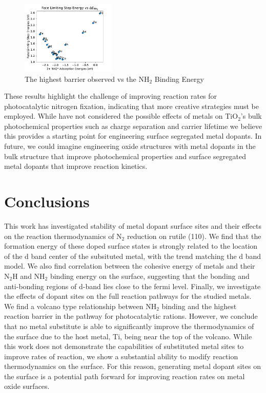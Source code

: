 \begin{figure}
    \centering
    \includegraphics[width=0.4\textwidth]{Images/NH2_v_rate_limiting.pdf}
    
    \caption{The highest barrier observed vs the NH$_2$ Binding Energy}
    \label{fig:NH2_limiting}
\end{figure}

These results highlight the challenge of improving reaction rates for photocatalytic nitrogen fixation, indicating that more creative strategies must be employed. While have not considered the possible effects of metals on TiO$_2$'s bulk photochemical properties such as charge separation and carrier lifetime we believe this provides a starting point for engineering surface segregated metal dopants. In future, we could imagine engineering oxide structures with metal dopants in the bulk structure that improve photochemical properties and surface segregated metal dopants that improve reaction kinetics.

\section{Conclusions}
This work has investigated stability of metal dopant surface sites and their effects on the reaction thermodynamics of N$_2$ reduction on rutile (110). We find that the formation energy of these doped surface states is strongly related to the location of the d band center of the subsituted metal, with the trend matching the d band model. We also find correlation between the cohesive energy of metals and their N$_2$H and NH$_2$ binding energy on the surface, suggesting that the bonding and anti-bonding regions of d-band lies close to the fermi level. Finally, we investigate the effects of dopant sites on the full reaction pathways for the studied metals. We find a volcano type relationship between NH$_2$ binding and the highest reaction barrier in the pathway for photocatalytic rations. However, we conclude that no metal substitute is able to significantly improve the thermodynamics of the surface due to the host metal, Ti, being near the top of the volcano. While this work does not demonstrate the capabilities of substituted metal sites to improve rates of reaction, we show a substantial ability to modify reaction thermodynamics on the surface. For this reason, generating metal dopant sites on the surface is a potential path forward for improving reaction rates on metal oxide surfaces.



